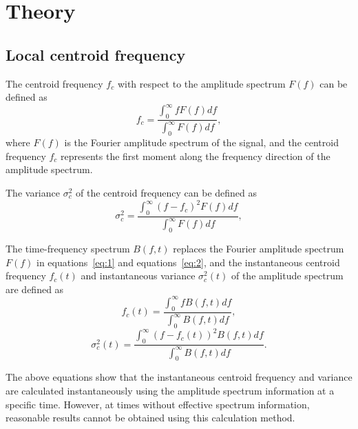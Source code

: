\section{Theory}

\subsection{Local centroid frequency}

The centroid frequency $f_c$ with respect to the amplitude spectrum $F(f)$
can be defined as \cite[]{Quan97}
\begin{equation}
  \label{eq:1}
  f_c=\frac{\int_{0}^{\infty} fF(f)df}{\int_{0}^{\infty} F(f)df},
\end{equation}
where $F(f)$ is the Fourier amplitude spectrum of the signal, and the
centroid frequency $f_c$ represents the first moment along the frequency
direction of the amplitude spectrum.

The variance $\sigma_c^2$ of the centroid frequency can be defined as
\begin{equation}
  \label{eq:2}
  \sigma_c^2=\frac{\int_{0}^{\infty} (f-f_c)^2F(f)df}{\int_{0}^{\infty} F(f)df},
\end{equation}

The time-frequency spectrum $B(f,t)$ replaces the Fourier amplitude spectrum
$F(f)$ in equations~\ref{eq:1} and equations~\ref{eq:2}, and the
instantaneous centroid frequency $f_c(t)$ and instantaneous variance
$\sigma_c^2(t)$ of the amplitude spectrum are defined as
\begin{equation}
  \label{eq:3}
  f_c(t)=\frac{\int_{0}^{\infty} fB(f,t)df}{\int_{0}^{\infty} B(f,t)df},
\end{equation}
\begin{equation}
  \label{eq:4}
  \sigma_c^2(t)=\frac{\int_{0}^{\infty} (f-f_c(t))^2B(f,t)df}
        {\int_{0}^{\infty} B(f,t)df}.
\end{equation}

The above equations show that the instantaneous centroid frequency and
variance are calculated instantaneously using the amplitude spectrum
information at a specific time. However, at times without effective
spectrum information, reasonable results cannot be obtained using this
calculation method.

